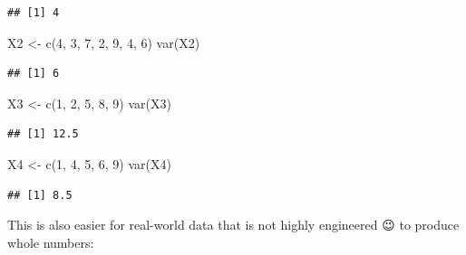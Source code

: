 \documentclass[
]{book}
\newenvironment{Shaded}{\begin{snugshade}}{\end{snugshade}}
\newcommand{\DecValTok}[1]{\textcolor[rgb]{0.00,0.00,0.81}{#1}}
\newcommand{\FunctionTok}[1]{\textcolor[rgb]{0.00,0.00,0.00}{#1}}
\newcommand{\NormalTok}[1]{#1}
\newcommand{\OtherTok}[1]{\textcolor[rgb]{0.56,0.35,0.01}{#1}}
\newcommand{\SpecialCharTok}[1]{\textcolor[rgb]{0.00,0.00,0.00}{#1}}
\begin{document}
\begin{verbatim}
## [1] 4
\end{verbatim}

\begin{Shaded}
\begin{Highlighting}[]
\NormalTok{X2 }\OtherTok{\textless{}{-}} \FunctionTok{c}\NormalTok{(}\DecValTok{4}\NormalTok{, }\DecValTok{3}\NormalTok{, }\DecValTok{7}\NormalTok{, }\DecValTok{2}\NormalTok{, }\DecValTok{9}\NormalTok{, }\DecValTok{4}\NormalTok{, }\DecValTok{6}\NormalTok{)}
\FunctionTok{var}\NormalTok{(X2)}
\end{Highlighting}
\end{Shaded}

\begin{verbatim}
## [1] 6
\end{verbatim}

\begin{Shaded}
\begin{Highlighting}[]
\NormalTok{X3 }\OtherTok{\textless{}{-}} \FunctionTok{c}\NormalTok{(}\DecValTok{1}\NormalTok{, }\DecValTok{2}\NormalTok{, }\DecValTok{5}\NormalTok{, }\DecValTok{8}\NormalTok{, }\DecValTok{9}\NormalTok{)}
\FunctionTok{var}\NormalTok{(X3)}
\end{Highlighting}
\end{Shaded}

\begin{verbatim}
## [1] 12.5
\end{verbatim}

\begin{Shaded}
\begin{Highlighting}[]
\NormalTok{X4 }\OtherTok{\textless{}{-}} \FunctionTok{c}\NormalTok{(}\DecValTok{1}\NormalTok{, }\DecValTok{4}\NormalTok{, }\DecValTok{5}\NormalTok{, }\DecValTok{6}\NormalTok{, }\DecValTok{9}\NormalTok{)}
\FunctionTok{var}\NormalTok{(X4)}
\end{Highlighting}
\end{Shaded}

\begin{verbatim}
## [1] 8.5
\end{verbatim}

This is also easier for real-world data that is not highly engineered 😉 to produce whole numbers:

\begin{Shaded}
\end{Shaded}
\end{document}
